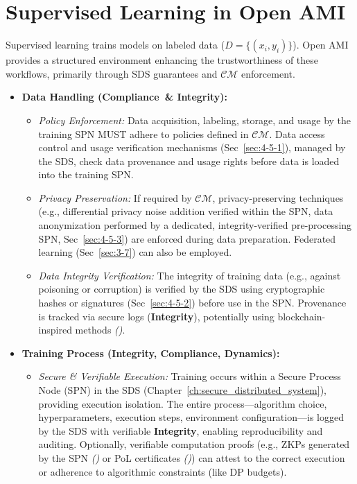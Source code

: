 \documentclass[12pt,a4paper]{report}
\renewcommand{\citep}[1]{\textit{\scriptsize{(\cite{#1})}}}
\newcommand{\Compliance}{\textbf{Compliance}}
\newcommand{\Integrity}{\textbf{Integrity}}
\begin{document}
	\section{Supervised Learning in Open AMI} %
	\label{sec:3-3} %
	
	Supervised learning trains models on labeled data ($D = \{(x_i, y_i)\}$). Open AMI provides a structured environment enhancing the trustworthiness of these workflows, primarily through SDS guarantees and $\mathcal{CM}$ enforcement.
	
	\begin{itemize}
		\item \textbf{Data Handling (\Compliance\ \& \Integrity):}
		\begin{itemize}
			\item \textit{Policy Enforcement:} Data acquisition, labeling, storage, and usage by the training SPN MUST adhere to policies defined in $\mathcal{CM}$. Data access control and usage verification mechanisms (Sec~\ref{sec:4-5-1}), managed by the SDS, check data provenance and usage rights before data is loaded into the training SPN.
			\item \textit{Privacy Preservation:} If required by $\mathcal{CM}$, privacy-preserving techniques (e.g., differential privacy noise addition verified within the SPN, data anonymization performed by a dedicated, integrity-verified pre-processing SPN, Sec~\ref{sec:4-5-3}) are enforced during data preparation. Federated learning (Sec~\ref{sec:3-7}) can also be employed.
			\item \textit{Data Integrity Verification:} The integrity of training data (e.g., against poisoning or corruption) is verified by the SDS using cryptographic hashes or signatures (Sec~\ref{sec:4-5-2}) before use in the SPN. Provenance is tracked via secure logs (\Integrity), potentially using blockchain-inspired methods \citep{ProML_Provenance_2022}.
		\end{itemize}
		\item \textbf{Training Process (Integrity, Compliance, Dynamics):}
		\begin{itemize}
			\item \textit{Secure \& Verifiable Execution:} Training occurs within a Secure Process Node (SPN) in the SDS (Chapter~\ref{ch:secure_distributed_system}), providing execution isolation. The entire process—algorithm choice, hyperparameters, execution steps, environment configuration—is logged by the SDS with verifiable \Integrity, enabling reproducibility and auditing. Optionally, verifiable computation proofs (e.g., ZKPs generated by the SPN \citep{Peng2025ZKMLSurvey} or PoL certificates \citep{Jia2021ProofOfLearning}) can attest to the correct execution or adherence to algorithmic constraints (like DP budgets).

\end{itemize}
\end{itemize}
\end{document}
